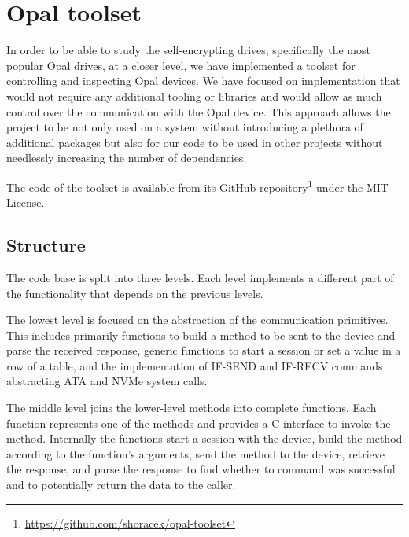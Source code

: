 

\chapter{Opal toolset}


In order to be able to study the self-encrypting drives, specifically the most popular Opal drives, at a closer level, we have implemented a toolset for controlling and inspecting Opal devices. 
We have focused on implementation that would not require any additional tooling or libraries and would allow as much control over the communication with the Opal device. This approach allows the project to be not only used on a system without introducing a plethora of additional packages but also for our code to be used in other projects without needlessly increasing the number of dependencies.

The code of the toolset is available from its GitHub repository\footnote{\url{https://github.com/shoracek/opal-toolset}} under the MIT License.


\section{Structure}

The code base is split into three levels. Each level implements a different part of the functionality that depends on the previous levels.

The lowest level is focused on the abstraction of the communication primitives. This includes primarily functions to build a method to be sent to the device and parse the received response, generic functions to start a session or set a value in a row of a table, and the implementation of IF-SEND and IF-RECV commands abstracting ATA and NVMe system calls.


The middle level joins the lower-level methods into complete functions. Each function represents one of the methods and provides a C interface to invoke the method. Internally the functions start a session with the device, build the method according to the function's arguments, send the method to the device, retrieve the response, and parse the response to find whether to command was successful and to potentially return the data to the caller.

